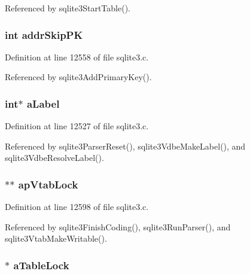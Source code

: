 Referenced by sqlite3\+Start\+Table().

\hypertarget{struct_parse_a5e0fd8725f252f5ecaceeb20a054c566}{}
\subsubsection[{addr\+Skip\+P\+K}]{\setlength{\rightskip}{0pt plus 5cm}int addr\+Skip\+P\+K}\label{struct_parse_a5e0fd8725f252f5ecaceeb20a054c566}


Definition at line 12558 of file sqlite3.\+c.



Referenced by sqlite3\+Add\+Primary\+Key().

\hypertarget{struct_parse_a5ba7d7db3dd21c05465292dbc43abf68}{}
\subsubsection[{a\+Label}]{\setlength{\rightskip}{0pt plus 5cm}int$\ast$ a\+Label}\label{struct_parse_a5ba7d7db3dd21c05465292dbc43abf68}


Definition at line 12527 of file sqlite3.\+c.



Referenced by sqlite3\+Parser\+Reset(), sqlite3\+Vdbe\+Make\+Label(), and sqlite3\+Vdbe\+Resolve\+Label().

\hypertarget{struct_parse_ab7345e654d91517cb318cce751069b27}{}
\subsubsection[{ap\+Vtab\+Lock}]{$\ast$$\ast$ ap\+Vtab\+Lock}\label{struct_parse_ab7345e654d91517cb318cce751069b27}


Definition at line 12598 of file sqlite3.\+c.



Referenced by sqlite3\+Finish\+Coding(), sqlite3\+Run\+Parser(), and sqlite3\+Vtab\+Make\+Writable().

\hypertarget{struct_parse_a2a8278088c2da698f2cbd33fa56a5834}{}
\subsubsection[{a\+Table\+Lock}]{$\ast$ a\+Table\+Lock}\label{struct_parse_a2a8278088c2da698f2cbd33fa56a5834}


